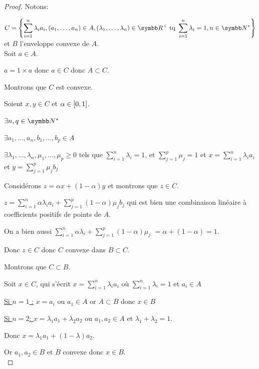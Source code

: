 \begin{proof}
    Notons:
    
    $\displaystyle C = \left\{\sum_{i = 1}^n \lambda_i a_i, (a_1, \dots, a_n) \in A, (\lambda_1, \dots, \lambda_n) \in \R^+ \text{ tq } \sum_{i = 1}^n \lambda_i = 1, n \in \N^*\right\}$
    et $B$ l'enveloppe convexe de $A$. \\

    Soit $a \in A$. 

    $a = 1 \times a$ donc $a \in C$ donc $A \subset C$. 

    Montrons que $C$ est convexe. 

    Soient $x, y \in C$ et $\alpha \in \left[0, 1\right]$. 

    $\exists n, q \in \N^*$

    $\exists a_1, \dots, a_n, b_1, \dots, b_p \in A$

    $\exists \lambda_1, \dots, \lambda_n, \mu_1, \dots, \mu_p \geqslant 0$ tels que 
    $\displaystyle \sum_{i = 1}^n \lambda_i = 1$, et $\displaystyle \sum_{j = 1}^p \mu_j = 1$ et 
    $\displaystyle x = \sum_{i = 1}^n \lambda_i a_i$ et $\displaystyle y = \sum_{j = 1}^p \mu_j b_j$

    Considérons $z = \alpha x + (1 - \alpha)y$ et montrons que $z \in C$. 

    $\displaystyle z = \sum_{i = 1}^n \alpha \lambda_i a_i + \sum_{j = 1}^p (1 - \alpha) \mu_j b_j$
    qui est bien une combinaison linéaire à coefficients positifs de points de $A$. 

    On a bien aussi $\displaystyle \sum_{i = 1}^n \alpha \lambda_i + \sum_{j = 1}^p (1 - \alpha) \mu_j$
    $ = \alpha + (1 - \alpha) = 1$. 

    Donc $z \in C$ donc $C$ convexe dans $B \subset C$. 

    Montrons que $C \subset B$. 

    Soit $x \in C$, qui s'écrit $\displaystyle x = \sum_{i = 1}^n \lambda_i a_i$ où 
    $\displaystyle \sum_{i = 1}^n \lambda_i = 1$ et $a_i \in A$

    \underline{Si $n = 1$ :} $x = a_i$ ou $a_1 \in A$
    or $A \subset B$ donc $x \in B$

    \underline{Si $n = 2$: } $x = \lambda_1 a_1 + \lambda_2 a_2$ ou $a_1, a_2 \in A$ et 
    $\lambda_1 + \lambda_2 = 1$. 

    Donc $x = \lambda_1 a_1 + (1 - \lambda)a_2$. 

    Or $a_1, a_2 \in B$ et $B$ convexe donc $x \in B$. \\


\end{proof}
